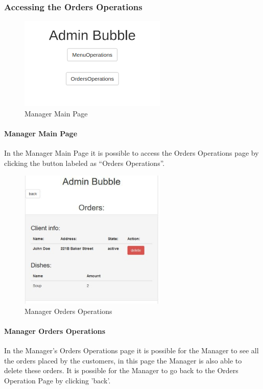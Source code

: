 \subsubsection{Accessing the Orders Operations}
\begin{figure}[H]
	\centering
	\includegraphics[width=7cm]{../../documenti/UserManualDemo/demo_screens/admin_main.png}
	\caption{Manager Main Page}
\end{figure}
\paragraph{Manager Main Page}
In the Manager Main Page it is possible to access the Orders Operations page by clicking the button labeled as ``Orders Operations''.

\begin{figure}[H]
	\centering
	\includegraphics[width=7cm]{../../documenti/UserManualDemo/demo_screens/admin_orders.png}
	\caption{Manager Orders Operations}
\end{figure}
\paragraph{Manager Orders Operations}
In the Manager's Orders Operations page it is possible for the Manager to see all the orders placed by the customers, in this page the Manager is also able to delete these orders.
It is possible for the Manager to go back to the Orders Operation Page by clicking 'back'.



